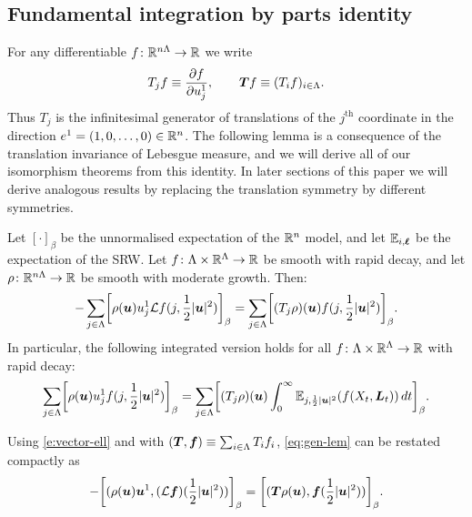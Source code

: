 \documentclass[11pt,a4paper]{article}
\begin{document}
\subsection{Fundamental integration by parts identity}
\label{sec:ibp}

For any differentiable $f\colon \mathbb{R}^{n\Lambda}\to \mathbb{R}$ we write
\begin{equation}
  \label{eq:gen-SRW-1}
  T_{j}f \equiv \frac{\partial f}{\partial u_{j}^{1}},
  \quad \quad
  \boldsymbol{T} f \equiv (T_if)_{i\in\Lambda}
  .
\end{equation}
Thus $T_j$ is the infinitesimal generator of translations of the $j^{\text{th}}$
coordinate in the direction $e^{1} =(1,0,\dots,0) \in\mathbb{R}^{n}$.  The
following lemma is a consequence of the translation invariance of
Lebesgue measure, and we will derive all of our
isomorphism theorems from this
identity.  In later sections
of this paper we will derive analogous
results by replacing the translation symmetry by different
symmetries.

\begin{lemma}
  \label{lem:gen-SRW}
  Let $[\cdot]_\beta$ be the unnormalised expectation of the $\mathbb{R}^n$
  model, and let $\mathbb{E}_{i,\boldsymbol{\ell}}$ be the expectation of the SRW.  Let
  $f\colon \Lambda\times \mathbb{R}^{\Lambda} \to \mathbb{R}$ be smooth with rapid
  decay, and let $\rho\colon \mathbb{R}^{n\Lambda}\to \mathbb{R}$ be smooth with
  moderate growth.  Then:
  \begin{equation}
    \label{eq:gen-lem}
    -\sum_{j\in\Lambda}\cb{\rho(\V{u})u_{j}^{1} \cL f(j, \frac{1}{2} |\V{u}|^{2})}_{\beta}
    =
    \sum_{j\in\Lambda} \cb{(T_j\rho)(\V{u})f(j,\frac{1}{2}|\V{u}|^{2})}_{\beta}
    .
  \end{equation}
  In particular, the following integrated version holds for all
  $f\colon\Lambda\times\mathbb{R}^{\Lambda}\to\mathbb{R}$ with rapid decay:
  \begin{equation}
    \label{eq:generic-iso}
    \sum_{j\in\Lambda}\uspin{\rho(\V{u})u_{j}^{1} f(j, \frac{1}{2} |\V{u}|^{2})}_{\beta}
    =
    \sum_{j\in\Lambda} \uspin{(T_j\rho)(\V{u})\int_0^\infty
      \E_{j,\frac{1}{2}|\V{u}|^2}(f(X_t,\V{L}_t))\,dt}_{\beta}
    .
\end{equation}
\end{lemma}

\begin{remark}
  \label{rem:srw-compact}
  Using \eqref{e:vector-ell} and with
  $(\boldsymbol{T},\boldsymbol{f}) \equiv \sum_{i\in\Lambda} T_{i}f_{i}$,
  \eqref{eq:gen-lem} can be restated compactly as
  \begin{equation} 
    \label{e:TLrho}
    -\uspin{(\rho(\V{u})\V{u}^1, (\mathcal{L} \V{f})(\frac{1}{2}|\V{u}|^{2}))}_\beta
    =
    \uspin{(\V{T}\rho(\V{u}), \V{f}(\frac{1}{2}|\V{u}|^{2}))}_\beta
    .
  \end{equation}
\end{remark}
\end{document}

